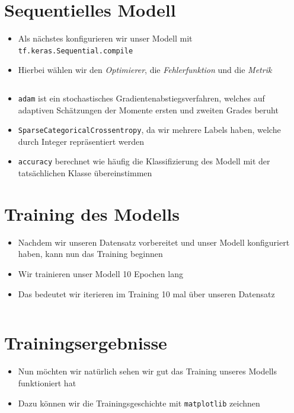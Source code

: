\documentclass[t]{beamer}
\newcommand\pycode[1]{\inputminted[frame=lines, framesep=2mm, fontsize=\normalsize]{python}{#1}}
\begin{document}
\section{Sequentielles Modell}
\begin{frame}
    \begin{itemize}
        \item Als nächstes konfigurieren wir unser Modell mit \texttt{tf.keras.Sequential.compile}
        \item Hierbei wählen wir den \emph{Optimierer}, die \emph{Fehlerfunktion} und die \emph{Metrik}
        \pycode{./code-snippets/model-compile.py}
        \item \texttt{adam} ist ein stochastisches Gradientenabstiegsverfahren, welches auf adaptiven Schätzungen der Momente ersten und zweiten Grades beruht
        \item \texttt{SparseCategoricalCrossentropy}, da wir mehrere Labels haben, welche durch Integer repräsentiert werden
        \item \texttt{accuracy} berechnet wie häufig die Klassifizierung des Modell mit der tatsächlichen Klasse übereinstimmen
    \end{itemize}
\end{frame}

\section{Training des Modells}
\begin{frame}
    \begin{itemize}
        \item Nachdem wir unseren Datensatz vorbereitet und unser Modell konfiguriert haben, kann nun das Training beginnen
        \newline
        \item Wir trainieren unser Modell 10 Epochen lang
        \item Das bedeutet wir iterieren im Training 10 mal über unseren Datensatz
        \pycode{./code-snippets/model-fit.py}
    \end{itemize}
\end{frame}

\section{Trainingsergebnisse}
\begin{frame}
    \begin{itemize}
        \item Nun möchten wir natürlich sehen wir gut das Training unseres Modells funktioniert hat
        \item Dazu können wir die Trainingsgeschichte mit \texttt{matplotlib} zeichnen
        \pycode{./code-snippets/plot-results.py}
    \end{itemize}
\end{frame}
\end{document}
